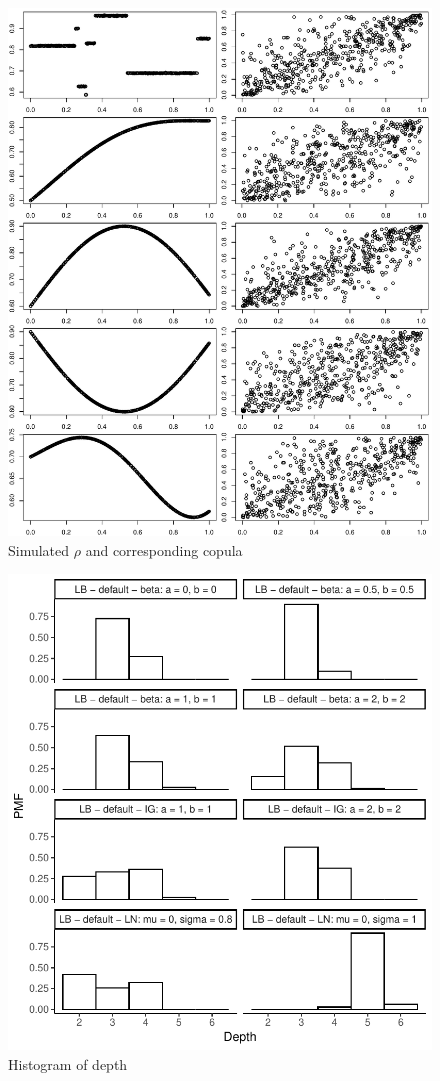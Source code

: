 \documentclass{amsart}
\begin{document}
\begin{figure}[ht]
    \centering
    \includegraphics[width=0.95\linewidth]{true_rho_copula.pdf}
    \caption{Simulated $\rho$ and corresponding copula}
    \label{fig:sim-dat}
\end{figure}

\begin{figure}[ht]
	\centering
	\includegraphics[width=0.95\linewidth]{hist_depth_1.pdf}
	\caption{Histogram of depth}
	\label{fig:hist:depth:1}
\end{figure}
\end{document}
